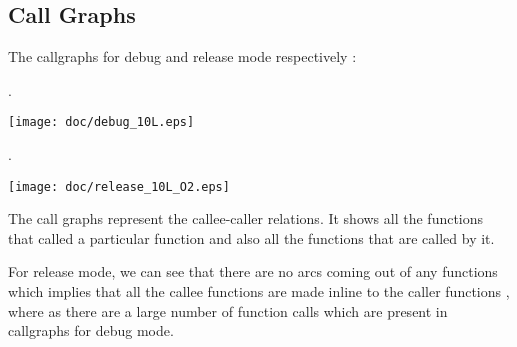 \documentclass[11pt,english]{article}
\begin{document}
\subsection{Call Graphs}

The callgraphs for debug and release mode respectively :

.

\texttt{[image: doc/debug\_10L.eps]}

.

\texttt{[image: doc/release\_10L\_O2.eps]}

The call graphs represent the callee-caller relations. It shows all the functions that called a particular function 
and also all the functions that are called by it.

For release mode, we can see that there are no arcs coming out of
any functions which implies that all the callee functions are made
inline to the caller functions , where as there are a large number
of function calls which are present in callgraphs for debug mode.
\end{document}
